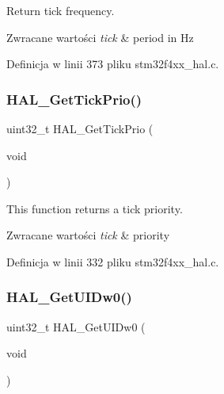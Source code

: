 Return tick frequency. 


\begin{DoxyRetVals}{Zwracane wartości}
{\em tick} & period in Hz \\
\hline
\end{DoxyRetVals}


Definicja w linii 373 pliku stm32f4xx\+\_\+hal.\+c.

\mbox{\label{group___h_a_l___exported___functions___group2_gacdcc8b5d33b9f97fe1b0abd6a86a3d4b}} 
\subsubsection{\texorpdfstring{H\+A\+L\+\_\+\+Get\+Tick\+Prio()}{HAL\_GetTickPrio()}}
{\footnotesize\ttfamily uint32\+\_\+t H\+A\+L\+\_\+\+Get\+Tick\+Prio (\begin{DoxyParamCaption}\item[{void}]{ }\end{DoxyParamCaption})}



This function returns a tick priority. 


\begin{DoxyRetVals}{Zwracane wartości}
{\em tick} & priority \\
\hline
\end{DoxyRetVals}


Definicja w linii 332 pliku stm32f4xx\+\_\+hal.\+c.

\mbox{\label{group___h_a_l___exported___functions___group2_gaf982aa0a575eef3758c0840a24077506}} 
\subsubsection{\texorpdfstring{H\+A\+L\+\_\+\+Get\+U\+I\+Dw0()}{HAL\_GetUIDw0()}}
{\footnotesize\ttfamily uint32\+\_\+t H\+A\+L\+\_\+\+Get\+U\+I\+Dw0 (\begin{DoxyParamCaption}\item[{void}]{ }\end{DoxyParamCaption})}



